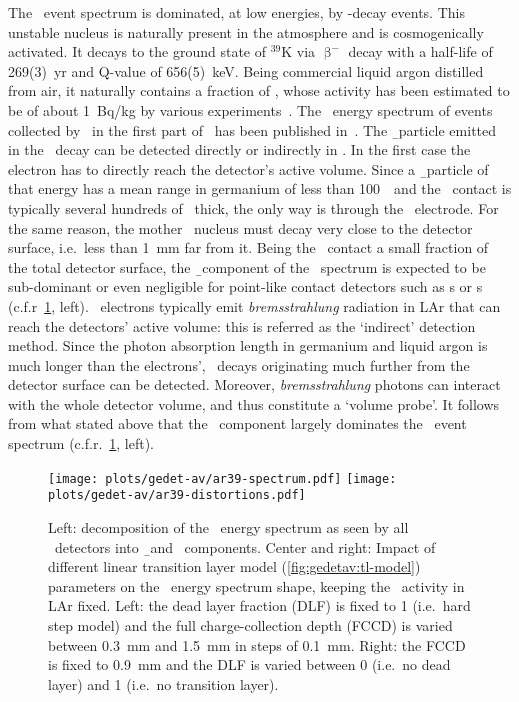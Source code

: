 The \gerda\ event spectrum is dominated, at low energies, by \Arl-decay events. This
unstable nucleus is naturally present in the atmosphere and is cosmogenically activated.
It decays to the ground state of $^{39}$K via $\upbeta^-$ decay with a half-life of
269(3)~yr and Q-value of 656(5)~keV. Being commercial liquid argon distilled from air, it
naturally contains a fraction of \Arl, whose activity has been estimated to be of about
1~Bq/kg by various experiments~\cite{Ajaj2019, Calvo2017, Benetti2006, Loosli1983}. The
\Arl\ energy spectrum of events collected by \gerda\ in the first part of \phasetwo\ has
been published in~\cite{Agostini2020}.
\newpar
The \b\ particle emitted in the \Arl\ decay can be detected directly or indirectly in
\gerda. In the first case the electron has to directly reach the detector's active volume.
Since a \b\ particle of that energy has a mean range in germanium of less than 100~\mum\
and the \nplus\ contact is typically several hundreds of \mum\ thick, the only way is
through the \pplus\ electrode. For the same reason, the mother \Arl\ nucleus must decay
very close to the detector surface, i.e.~less than 1~mm far from it. Being the \pplus\
contact a small fraction of the total detector surface, the \b\ component of the \Arl\
spectrum is expected to be sub-dominant or even negligible for point-like contact
detectors such as \bege{}s or \icoax{}s (c.f.r~\cref{fig:gedetav:ar39:distortions}, left).
\newpar
\Arl\ electrons typically emit \emph{bremsstrahlung} radiation in LAr that can reach the
detectors' active volume: this is referred as the `indirect' detection method. Since the
photon absorption length in germanium and liquid argon is much longer than the electrons',
\Arl\ decays originating much further from the detector surface can be detected. Moreover,
\emph{bremsstrahlung} photons can interact with the whole detector volume, and thus
constitute a `volume probe'. It follows from what stated above that the \g\ component
largely dominates the \Arl\ event spectrum (c.f.r.~\cref{fig:gedetav:ar39:distortions}, left).

\begin{figure}
  \centering
  \texttt{[image: plots/gedet-av/ar39-spectrum.pdf]}%
  \texttt{[image: plots/gedet-av/ar39-distortions.pdf]}
  \caption{%
    Left: decomposition of the \Arl\ energy spectrum as seen by all \gerda\ detectors into
    \b\ and \g\ components. Center and right: Impact of different linear transition layer
    model (\cref{fig:gedetav:tl-model}) parameters on the \Arl\ energy spectrum shape,
    keeping the \Arl\ activity in LAr fixed. Left: the dead layer fraction (DLF) is fixed
    to 1 (i.e.~hard step model) and the full charge-collection depth (FCCD) is varied
    between 0.3~mm and 1.5~mm in steps of 0.1~mm. Right: the FCCD is fixed to 0.9~mm and
    the DLF is varied between 0 (i.e.~no dead layer) and 1 (i.e.~no transition layer).
  }\label{fig:gedetav:ar39:distortions}
\end{figure}

